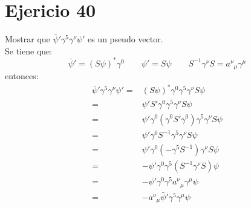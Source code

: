 \section*{Ejericio 40}
Mostrar que ${\bar{\psi}}' \gamma^5 \gamma^\nu {\psi}'$ es un pseudo vector.\\
Se tiene que:
\begin{equation*}
    \bar{\psi}'=\left(S\psi\right)^* \gamma^0 \qquad \psi'=S\psi \qquad S^{-1}\gamma^\nu S = {a^\nu}_\mu \gamma^\mu
\end{equation*}
entonces:
\begin{align*}
    {\bar{\psi}}' \gamma^5 \gamma^\nu {\psi}' =& \left(S\psi\right)^* \gamma^0 \gamma^5 \gamma^\nu S\psi \\
    =& {\psi}' S' \gamma^0 \gamma^5 \gamma^\nu S\psi  \\
    =& {\psi}' \gamma^0 \left(\gamma^0 S' \gamma^0\right) \gamma^5 \gamma^\nu S\psi \\
    =& {\psi}' \gamma^0  S^{-1} \gamma^5 \gamma^\nu S\psi \\
    =& {\psi}' \gamma^0 \left(-\gamma^5 S^{-1}\right)\gamma^\nu S\psi \\
    =& -{\psi}' \gamma^0 \gamma^5 \left(S^{-1}\gamma^\nu S\right)\psi \\ 
    =& -{\psi}' \gamma^0 \gamma^5 {a^\nu}_\mu \gamma^\mu \psi \\
    =& -{a^\nu}_\mu \bar{\psi}' \gamma^5 \gamma^\mu  \psi
\end{align*}